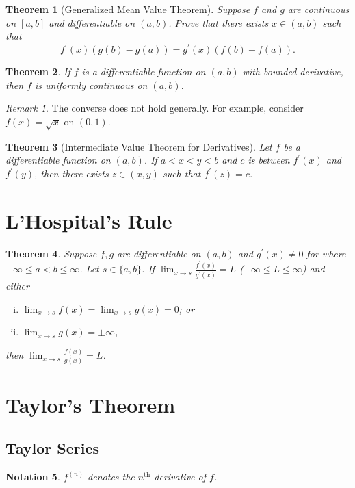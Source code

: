 \documentclass[12pt, lettersize]{book}
\theoremstyle{plain}
\newtheorem{thm}{Theorem}[section]
\newtheorem{nte}[thm]{Notation}
\theoremstyle{definition}
\theoremstyle{remark}
\newtheorem*{rem}{Remark}
\begin{document}
		\begin{thm}[Generalized Mean Value Theorem]
			Suppose $f$ and $g$ are continuous on $[a,b]$ and differentiable on $(a,b)$. Prove that there exists $x\in(a,b)$ such that
			\begin{displaymath}
				f^\prime(x)(g(b)-g(a))=g^\prime(x)(f(b)-f(a)).
			\end{displaymath}
		\end{thm}
		
		\begin{thm}
			If $f$ is a differentiable function on $(a,b)$ with bounded derivative, then $f$ is uniformly continuous on $(a,b)$.
		\end{thm}
		\begin{rem}
			The converse does not hold generally. For example, consider $f(x)=\sqrt{x}$ on $(0,1)$. 
		\end{rem}
		
		\begin{thm}[Intermediate Value Theorem for Derivatives]
			Let $f$ be a differentiable function on $(a,b)$. If $a<x<y<b$ and $c$ is between $f^\prime(x)$ and $f^\prime(y)$, then there exists $z\in(x,y)$ such that $f^\prime(z)=c$. 
		\end{thm}
		\newpage
		
		\section{L'Hospital's Rule}
		\begin{thm}
			Suppose $f,g$ are differentiable on $(a,b)$ and $g^\prime(x)\neq0$ for where $-\infty\leq a<b\leq\infty$. Let $s\in\{a,b\}$. If $\lim_{x\rightarrow s}\frac{f^\prime(x)}{g^\prime(x)}=L$ ($-\infty\leq L\leq \infty$) and either
			\begin{enumerate}[(i)]
				\item $\lim_{x\rightarrow s}f(x)=\lim_{x\rightarrow s}g(x)=0$; or
				\item $\lim_{x\rightarrow s}g(x)=\pm\infty$,
			\end{enumerate} 
			then $\lim_{x\rightarrow s}\frac{f(x)}{g(x)}=L$.
		\end{thm}
		\newpage
		\section{Taylor's Theorem}
		\subsection*{Taylor Series}
		\begin{nte}
			$f^{(n)}$ denotes the $n^\text{th}$ derivative of $f$.
		\end{nte}
		
\end{document}
